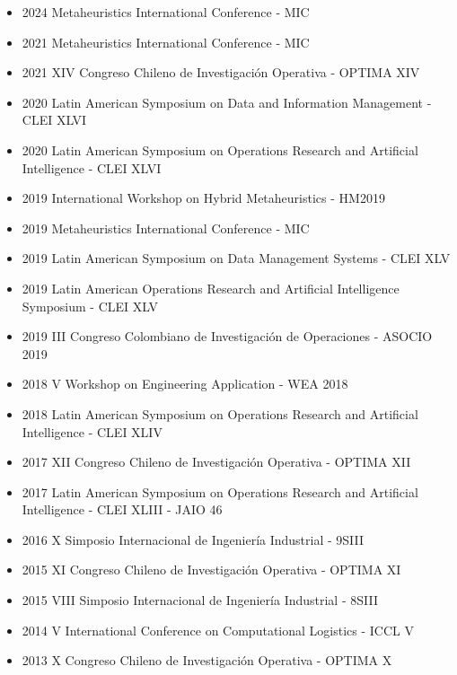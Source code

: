 {\begin{itemize}
    \item 2024 Metaheuristics International Conference - MIC
    \item 2021 Metaheuristics International Conference - MIC
    \item 2021 XIV Congreso Chileno de Investigaci\'on Operativa - OPTIMA XIV
    \item 2020 Latin American Symposium on Data and Information Management - CLEI XLVI
    \item 2020 Latin American Symposium on Operations Research and Artificial Intelligence - CLEI XLVI
    \item 2019 International Workshop on Hybrid Metaheuristics - HM2019
    \item 2019 Metaheuristics International Conference - MIC
    \item 2019 Latin American Symposium on Data Management Systems - CLEI XLV
    \item 2019 Latin American Operations Research and Artificial Intelligence Symposium - CLEI XLV
    \item 2019 III Congreso Colombiano de Investigaci\'on de Operaciones - ASOCIO 2019
    \item 2018 V Workshop on Engineering Application - WEA 2018
    \item 2018 Latin American Symposium on Operations Research and Artificial Intelligence - CLEI XLIV
    \item 2017 XII Congreso Chileno de Investigaci\'on Operativa - OPTIMA XII
    \item 2017 Latin American Symposium on Operations Research and Artificial Intelligence - CLEI XLIII - JAIO 46
    \item 2016 X Simposio Internacional de Ingenier\'ia Industrial - 9SIII
    \item 2015 XI Congreso Chileno de Investigaci\'on Operativa - OPTIMA XI
    \item 2015 VIII Simposio Internacional de Ingenier\'ia Industrial - 8SIII
    \item 2014 V International Conference on Computational Logistics - ICCL V
    \item 2013 X Congreso Chileno de Investigaci\'on Operativa - OPTIMA X
\end{itemize}
}

\clearpage
